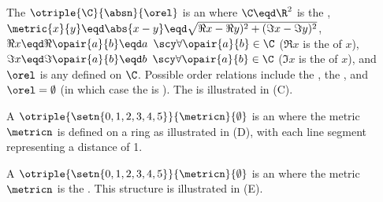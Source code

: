 \begin{example}
\label{ex:Cplane}
The  $\otriple{\C}{\absn}{\orel}$ is an  
where $\C\eqd\R^2$ is the , 
$\metric{x}{y}\eqd\abs{x-y}\eqd\sqrt{\Re x-\Re y)^2+(\Im x-\Im y)^2}$,
$\Re x\eqd\Re\opair{a}{b}\eqd a$ ${\scy\forall\opair{a}{b}\in\C}$ ($\Re x$ is the  of $x$),
$\Im x\eqd\Im\opair{a}{b}\eqd b$ ${\scy\forall\opair{a}{b}\in\C}$ ($\Im x$ is the  of $x$),
and $\orel$ is any  defined on $\C$.
Possible order relations include the  ,
the  ,
and $\orel=\emptyset$ (in which case the  is ).
The  is illustrated in  (C).
\end{example}

\begin{example}
\label{ex:ring6}
A  $\otriple{\setn{0,1,2,3,4,5}}{\metricn}{\emptyset}$ is an  
where the metric $\metricn$ is defined on a ring as illustrated in  (D), with each line segment representing a 
distance of 1.
\end{example}

\begin{example}
\label{ex:discretemetric6}
A  $\otriple{\setn{0,1,2,3,4,5}}{\metricn}{\emptyset}$ is an  
where the metric $\metricn$ is the  .
This structure is illustrated in  (E).
\end{example}

